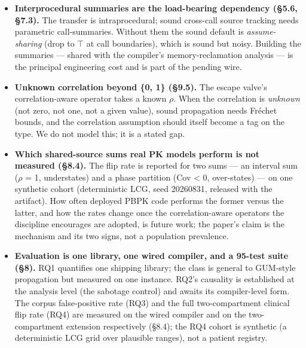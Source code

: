 \documentclass[sigplan,review,anonymous,10pt]{acmart}
\begin{document}
\begin{itemize}
  \item \textbf{Interprocedural summaries are the load-bearing dependency (§5.6, §7.3).} The transfer is intraprocedural; sound cross-call source tracking needs parametric call-summaries. Without them the sound default is \emph{assume-sharing} (drop to \texttt{$\top$} at call boundaries), which is sound but noisy. Building the summaries --- shared with the compiler's memory-reclamation analysis --- is the principal engineering cost and is part of the pending wire.
\end{itemize}

\begin{itemize}
  \item \textbf{Unknown correlation beyond \{0, 1\} (§9.5).} The escape valve's correlation-aware operator takes a known \texttt{$\rho$}. When the correlation is \emph{unknown} (not zero, not one, not a given value), sound propagation needs Fréchet bounds, and the correlation assumption should itself become a tag on the type. We do not model this; it is a stated gap.
\end{itemize}

\begin{itemize}
  \item \textbf{Which shared-source sums real PK models perform is not measured (§8.4).} The flip rate is reported for two sums --- an interval sum ($\rho$ = 1, understates) and a phase partition (Cov < 0, over-states) --- on one synthetic cohort (deterministic LCG, seed 20260831, released with the artifact). How often deployed PBPK code performs the former versus the latter, and how the rates change once the correlation-aware operators the discipline encourages are adopted, is future work; the paper's claim is the mechanism and its two signs, not a population prevalence.
\end{itemize}

\begin{itemize}
  \item \textbf{Evaluation is one library, one wired compiler, and a 95-test suite (§8).} RQ1 quantifies one shipping library; the class is general to GUM-style propagation but measured on one instance. RQ2's causality is established at the analysis level (the sabotage control) and awaits its compiler-level form. The corpus false-positive rate (RQ3) and the full two-compartment clinical flip rate (RQ4) are measured on the wired compiler and on the two-compartment extension respectively (§8.4); the RQ4 cohort is synthetic (a deterministic LCG grid over plausible ranges), not a patient registry.
\end{itemize}
\end{document}
